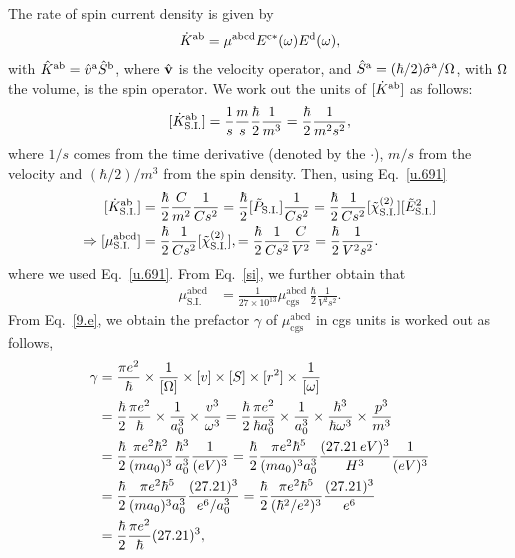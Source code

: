 \documentclass[floatfix,prb,aps,superscriptaddress,11pt]{revtex4}
\begin{document}
The rate of spin current density is given by
\begin{align}\label{eee.0}
\dot K^{\mathrm{a}\mathrm{b}}
=\mu^{\mathrm{abcd}}
E^{\mathrm{c}*}(\omega) E^{\mathrm{d}}(\omega)  
,
\end{align} 
with $\hat K^{\mathrm{a}\mathrm{b}}=\hat v^{\mathrm{a}} \hat S^{\mathrm{b}}$, where $\hat {\mathbf{v}}$ is
the velocity operator, and
$\hat S^{\mathrm{a}}=(\hbar/2)\hat{\sigma}^{\mathrm{a}}/\Omega$, with $\Omega$ the volume, is the
spin operator. We work out the
units of $[\dot K^{\mathrm{a}\mathrm{b}}]$ as follows:
\begin{align}\label{eee.1}
[\dot K^{\mathrm{a}\mathrm{b}}_{\mathrm{S.I.}}]
=\frac{1}{s}\frac{m}{s}\frac{\hbar}{2} \frac{1}{m^3}
=\frac{\hbar}{2} \frac{1}{m^2s^2}
,
\end{align} 
where $1/s$ comes from the time derivative (denoted by the $\cdot$), $m/s$
from the velocity and $(\hbar/2)/m^3$ from the spin density. Then,
using Eq.~\eqref{u.691}
\begin{align}\label{eee.2}
[\dot K^{\mathrm{a}\mathrm{b}}_{\mathrm{S.I.}}]
&=\frac{\hbar}{2} \frac{C}{m^2}\frac{1}{Cs^2}
=\frac{\hbar}{2} [\tilde P _{\mathrm{S.I.}}]\frac{1}{Cs^2}
=\frac{\hbar}{2} \frac{1}{Cs^2}[\tilde \chi^{(2)}_{\mathrm{S.I.}}]
[\tilde E^2 _{\mathrm{S.I.}}]
\nonumber\\
\Rightarrow[\mu^{\mathrm{abcd}}_{\mathrm{S.I.}}]&=
\frac{\hbar}{2} \frac{1}{Cs^2}[\tilde \chi^{(2)}_{\mathrm{S.I.}}],
=
\frac{\hbar}{2} \frac{1}{Cs^2}\frac{C}{V^2}
=
\frac{\hbar}{2} \frac{1}{V^2s^2}.  
\end{align} 
where we used Eq.~\eqref{u.691}. From Eq.~\eqref{si}, we further
obtain that
\begin{align}\label{eee.3}
\mu^{\mathrm{abcd}}_{\mathrm{S.I.}}&=
\frac{1}{27\times 10^{13}}
\mu^{\mathrm{abcd}}_{\mathrm{cgs}}
\,\frac{\hbar}{2} \frac{1}{V^2s^2}. 
\end{align}  
From 
Eq.~\eqref{9.e}, we obtain the prefactor $\gamma$ of
$\mu^{\mathrm{abcd}}_{\mathrm{cgs}}$ in
 cgs  units is worked out as follows, 
\begin{align}\label{eee.4}
\gamma
&=\frac{\pi e^2}{\hbar}\times\frac{1}{[\Omega]}\times [v] \times [S] 
  \times [r^2] \times \frac{1}{[\omega]}
\nonumber\\
&=\frac{\hbar}{2}\frac{\pi e^2}{\hbar}\times\frac{1}{a^3_0}\times 
\frac{v^3}{\omega^3}
=\frac{\hbar}{2}\frac{\pi e^2}{\hbar a^3_0}\times\frac{1}{a^3_0}\times 
\frac{\hbar^3}{\hbar\omega^3}
\times 
\frac{p^3}{m^3}
\nonumber\\
&
=\frac{\hbar}{2}\frac{\pi e^2\hbar^2}{(m a_0)^3}\frac{\hbar^3}{a^3_0}
\frac{1}{(eV)^3}
=\frac{\hbar}{2}\frac{\pi e^2\hbar^5}{(m a_0)^3a^3_0}
\frac{(27.21\,eV)^3}{H^3}
\frac{1}{(eV)^3}
\nonumber\\
&
=\frac{\hbar}{2}\frac{\pi e^2\hbar^5}{(m a_0)^3a^3_0}
\frac{(27.21)^3}{e^6/a^3_0}
=\frac{\hbar}{2}\frac{\pi e^2\hbar^5}{(\hbar^2/e^2)^3}
\frac{(27.21)^3}{e^6}
\nonumber\\
&
=\frac{\hbar}{2}
\frac{\pi e^2}{\hbar}(27.21)^3 
,
\end{align} 
\end{document}

